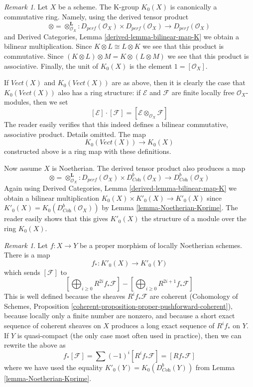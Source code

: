 \documentclass{stacks-project}
\theoremstyle{plain}
\theoremstyle{definition}
\theoremstyle{remark}
\newtheorem{remark}[subsection]{Remark}
\numberwithin{equation}{subsection}
\begin{document}
\begin{remark}
\label{remark-K-ring}
Let $X$ be a scheme. The K-group $K_0(X)$ is canonically a commutative ring.
Namely, using the derived tensor product
$$
\otimes = \otimes^\mathbf{L}_{\mathcal{O}_X} :
D_{perf}(\mathcal{O}_X) \times D_{perf}(\mathcal{O}_X)
\longrightarrow
D_{perf}(\mathcal{O}_X)
$$
and Derived Categories, Lemma \ref{derived-lemma-bilinear-map-K}
we obtain a bilinear multiplication. Since $K \otimes L \cong L \otimes K$
we see that this product is commutative. Since
$(K \otimes L) \otimes M = K \otimes (L \otimes M)$
we see that this product is associative.
Finally, the unit of $K_0(X)$ is the element $1 = [\mathcal{O}_X]$.

\medskip\noindent
If $\textit{Vect}(X)$ and $K_0(\textit{Vect}(X))$ are as above, then
it is clearly the case that $K_0(\textit{Vect}(X))$ also has a
ring structure: if $\mathcal{E}$ and $\mathcal{F}$ are finite locally free
$\mathcal{O}_X$-modules, then we set
$$
[\mathcal{E}] \cdot [\mathcal{F}] =
[\mathcal{E} \otimes_{\mathcal{O}_X} \mathcal{F}]
$$
The reader easily verifies that this indeed defines a bilinear
commutative, associative product. Details omitted. The map
$$
K_0(\textit{Vect}(X)) \longrightarrow K_0(X)
$$
constructed above is a ring map with these definitions.

\medskip\noindent
Now assume $X$ is Noetherian. The derived tensor product also produces
a map
$$
\otimes = \otimes^\mathbf{L}_{\mathcal{O}_X} :
D_{perf}(\mathcal{O}_X) \times D^b_{\textit{Coh}}(\mathcal{O}_X)
\longrightarrow
D^b_{\textit{Coh}}(\mathcal{O}_X)
$$
Again using Derived Categories, Lemma \ref{derived-lemma-bilinear-map-K}
we obtain a bilinear multiplication $K_0(X) \times K'_0(X) \to K'_0(X)$
since $K'_0(X) = K_0(D^b_{\textit{Coh}}(\mathcal{O}_X))$ by
Lemma \ref{lemma-Noetherian-Kprime}.
The reader easily shows that this gives $K'_0(X)$ the structure
of a module over the ring $K_0(X)$.
\end{remark}

\begin{remark}
\label{remark-pushforward-K}
Let $f : X \to Y$ be a proper morphism of locally Noetherian schemes.
There is a map
$$
f_* : K'_0(X) \longrightarrow K'_0(Y)
$$
which sends $[\mathcal{F}]$ to
$$
[\bigoplus\nolimits_{i \geq 0} R^{2i}f_*\mathcal{F}] -
[\bigoplus\nolimits_{i \geq 0} R^{2i + 1}f_*\mathcal{F}]
$$
This is well defined because the sheaves $R^if_*\mathcal{F}$
are coherent (Cohomology of Schemes, Proposition
\ref{coherent-proposition-proper-pushforward-coherent}), because locally
only a finite number are nonzero, and because
a short exact sequence of coherent sheaves on $X$ produces a long
exact sequence of $R^if_*$ on $Y$. If $Y$ is quasi-compact (the only
case most often used in practice), then we can rewrite the above as
$$
f_*[\mathcal{F}] = \sum (-1)^i[R^if_*\mathcal{F}] = [Rf_*\mathcal{F}]
$$
where we have used the equality $K'_0(Y) = K_0(D^b_{\textit{Coh}}(Y))$ from
Lemma \ref{lemma-Noetherian-Kprime}.
\end{remark}
\end{document}
